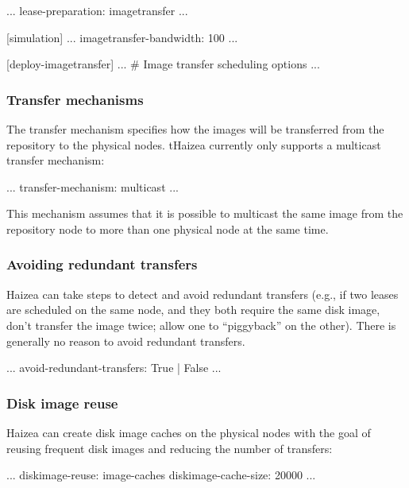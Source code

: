\begin{wideshellverbatim}
[general]
...
lease-preparation: imagetransfer
...

[simulation]
...
imagetransfer-bandwidth: 100
...

[deploy-imagetransfer]
...
\# Image transfer scheduling options
...
\end{wideshellverbatim}

\subsubsection{Transfer mechanisms}

The transfer mechanism specifies how the images will be transferred from the repository to the physical nodes. tHaizea currently only supports a multicast transfer mechanism:

\begin{wideshellverbatim}
...
transfer-mechanism: multicast
...
\end{wideshellverbatim}

This mechanism assumes that it is possible to multicast the same image from the repository node to more than one physical node at the same time.

\subsubsection{Avoiding redundant transfers}

Haizea can take steps to
detect and avoid redundant transfers (e.g., if two leases are
scheduled on the same node, and they both require the same disk
image, don't transfer the image twice; allow one to ``piggyback''
on the other). There is generally no reason to avoid redundant transfers.

\begin{wideshellverbatim}
...
avoid-redundant-transfers: True | False
...
\end{wideshellverbatim}


\subsubsection{Disk image reuse}

Haizea can create disk image caches on the physical nodes with the goal of reusing frequent disk images and reducing the number of transfers: 

\begin{wideshellverbatim}
...
diskimage-reuse: image-caches
diskimage-cache-size: 20000
...
\end{wideshellverbatim}


